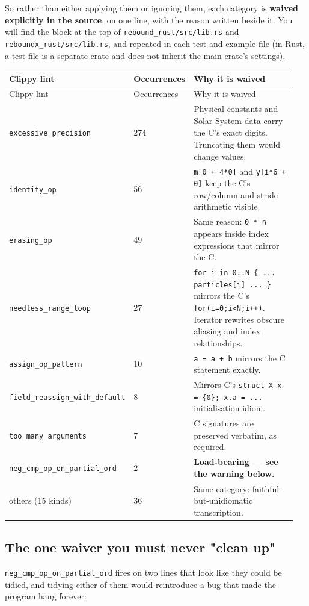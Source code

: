 \documentclass[11pt]{article}
\begin{document}
So rather than either applying them or ignoring them, each category is \textbf{waived explicitly in the source}, on one line, with the reason written beside it. You will find the block at the top of \texttt{rebound\_rust/src/lib.rs} and \texttt{reboundx\_rust/src/lib.rs}, and repeated in each test and example file (in Rust, a test file is a separate crate and does not inherit the main crate's settings).

\begin{longtable}{L{0.150\linewidth}L{0.096\linewidth}L{0.704\linewidth}}
\toprule
Clippy lint & Occurrences & Why it is waived \\
\midrule
\endfirsthead
\toprule
Clippy lint & Occurrences & Why it is waived \\
\midrule
\endhead
\texttt{excessive\_precision} & 274 & Physical constants and Solar System data carry the C's exact digits. Truncating them would change values. \\
\texttt{identity\_op} & 56 & \texttt{m[0 + 4*0]} and \texttt{y[i*6 + 0]} keep the C's row/column and stride arithmetic visible. \\
\texttt{erasing\_op} & 49 & Same reason: \texttt{0 * n} appears inside index expressions that mirror the C. \\
\texttt{needless\_range\_loop} & 27 & \texttt{for i in 0..N \{ ... particles[i] ... \}} mirrors the C's \texttt{for(i=0;i<N;i++)}. Iterator rewrites obscure aliasing and index relationships. \\
\texttt{assign\_op\_pattern} & 10 & \texttt{a = a + b} mirrors the C statement exactly. \\
\texttt{field\_reassign\_with\_default} & 8 & Mirrors C's \texttt{struct X x = \{0\}; x.a = ...} initialisation idiom. \\
\texttt{too\_many\_arguments} & 7 & C signatures are preserved verbatim, as required. \\
\texttt{neg\_cmp\_op\_on\_partial\_ord} & 2 & \textbf{Load-bearing --- see the warning below.} \\
others (15 kinds) & 36 & Same category: faithful-but-unidiomatic transcription. \\
\bottomrule
\end{longtable}

\subsection{The one waiver you must never "clean up"}

\texttt{neg\_cmp\_op\_on\_partial\_ord} fires on two lines that look like they could be tidied, and tidying either of them would reintroduce a bug that made the program hang forever:
\end{document}
